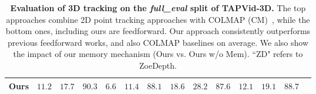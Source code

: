 \begin{table}
\begin{center}
{\begin{tabular}{rccccccccccccc}
            Ours                  & $\mathbf{11.2}$ & $\mathbf{17.7}$  & $\mathbf{90.3}$  & $6.6$   & $11.4$ & $\mathbf{88.1}$ & $\mathbf{18.6}$ & $\mathbf{28.2}$ & $\mathbf{87.6}$ & $\mathbf{12.1}$ & $\mathbf{19.1}$ & $\mathbf{88.7}$ \\
            \bottomrule
        \end{tabular}
        }
    \end{center}
    \caption{
        \textbf{Evaluation of 3D tracking on the \textit{full\_eval} split of TAPVid-3D.} 
        The top approaches combine 2D point tracking approaches with COLMAP (CM)~\cite{schoenberger2016sfm}, while the bottom ones, including ours are feedforward.
        Our approach consistently outperforms previous feedforward works, and also COLMAP baselines on average.
        We also show the impact of our memory mechanism (Ours vs. Ours w/o Mem). ``ZD" refers to ZoeDepth.}
    \label{table:tapvid3d3dtrack}
\end{table}

